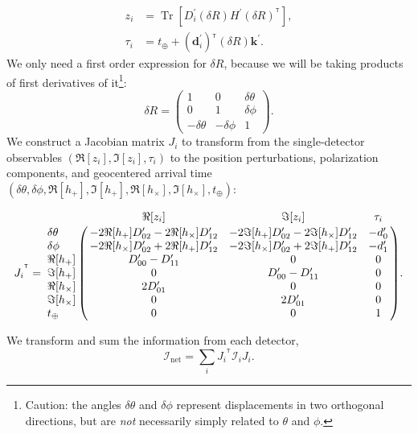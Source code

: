 \documentclass[amsmath,amssymb,aps,prx,reprint,nopreprintnumbers,nofootinbib]{revtex4-1}
\DeclareMathOperator{\Tr}{Tr}
\newcommand\transpose{\ensuremath{^{^\mathsf{T}}}}
\begin{document}
%
\begin{align}
    z_i &= \Tr \left[ D_i^\prime (\delta R) H^\prime (\delta R)\transpose \right], \\
    \tau_i &= t_\oplus + (\mathbf{d}_i^\prime)\transpose (\delta R) \mathbf{k}^\prime.
\end{align}
%
We only need a first order expression for $\delta R$, because we will be taking products of first derivatives of it\footnote{Caution: the angles $\delta\theta$ and $\delta\phi$ represent displacements in two orthogonal directions, but are \emph{not} necessarily simply related to $\theta$ and $\phi$.}:
%
\begin{equation}
    \delta R = \left(
        \begin{array}{ccc}
            1 & 0 & \delta\theta \\
            0 & 1 & \delta\phi \\
            -\delta\theta & -\delta\phi & 1
        \end{array}
    \right).
\end{equation}
%
We construct a Jacobian matrix $J_i$ to transform from the single\nobreakdashes-detector observables $(\Re[z_i], \Im[z_i], \tau_i)$ to the position perturbations, polarization components, and geocentered arrival time \\ $(\delta\theta, \delta\phi, \Re[h_+], \Im[h_+], \Re[h_\times], \Im[h_\times], t_\oplus)$:
%
\begin{widetext}
\begin{equation}\label{eq:jacobian-detector-tensor}
    {J_i}\transpose = \bordermatrix{
        ~ & \Re[z_i] & \Im[z_i] & \tau_i \cr
        \delta\theta &
        -2\Re[h_+]D_{02}^\prime -2\Re[h_\times]D_{12}^\prime &
        -2\Im[h_+]D_{02}^\prime -2\Im[h_\times]D_{12}^\prime &
        -d_0^\prime \cr
        \delta\phi &
        -2\Re[h_\times]D_{02}^\prime +2\Re[h_+]D_{12}^\prime &
        -2\Im[h_\times]D_{02}^\prime +2\Im[h_+]D_{12}^\prime &
        -d_1^\prime \cr
        \Re[h_+] & D_{00}^\prime - D_{11}^\prime & 0 & 0 \cr
        \Im[h_+] & 0 & D_{00}^\prime - D_{11}^\prime & 0 \cr
        \Re[h_\times] & 2D_{01}^\prime & 0 & 0 \cr
        \Im[h_\times] & 0 & 2D_{01}^\prime & 0 \cr
        t_\oplus & 0 & 0 & 1
    }.
\end{equation}
\end{widetext}
%
We transform and sum the information from each detector,
%
\begin{equation}\label{eq:summed-information}
    \mathcal{I}_\mathrm{net} = \sum_i {J_i}\transpose \mathcal{I}_i {J_i}.
\end{equation}
\end{document}

